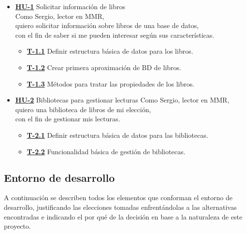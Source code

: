 \begin{itemize}
    \item \href{https://github.com/Anglepi/My-Many-Reads/issues/29}{\textbf{HU-1}} Solicitar información de libros \\
    Como Sergio, lector en MMR, \\
    quiero solicitar información sobre libros de una base de datos, \\
    con el fin de saber si me pueden interesar según sus características.
    \begin{itemize}
        \item \href{https://github.com/Anglepi/My-Many-Reads/issues/31}{\textbf{T-1.1}} Definir estructura básica de datos para los libros.
        \item \href{https://github.com/Anglepi/My-Many-Reads/issues/32}{\textbf{T-1.2}} Crear primera aproximación de BD de libros.
        \item \href{https://github.com/Anglepi/My-Many-Reads/issues/33}{\textbf{T-1.3}} Métodos para tratar las propiedades de los libros.
    \end{itemize}
    \item \href{https://github.com/Anglepi/My-Many-Reads/issues/30}{\textbf{HU-2}} Bibliotecas para gestionar lecturas
    Como Sergio, lector en MMR, \\
    quiero una biblioteca de libros de mi elección, \\
    con el fin de gestionar mis lecturas.
    \begin{itemize}
        \item \href{https://github.com/Anglepi/My-Many-Reads/issues/34}{\textbf{T-2.1}} Definir estructura básica de datos para las bibliotecas.
        \item \href{https://github.com/Anglepi/My-Many-Reads/issues/35}{\textbf{T-2.2}} Funcionalidad básica de gestión de bibliotecas.
    \end{itemize}
\end{itemize}

\subsection{Entorno de desarrollo}

A continuación se describen todos los elementos que conforman el entorno de desarrollo, justificando las elecciones tomadas enfrentándolas a las alternativas encontradas e indicando el por qué de la decisión en base a la naturaleza de este proyecto.

